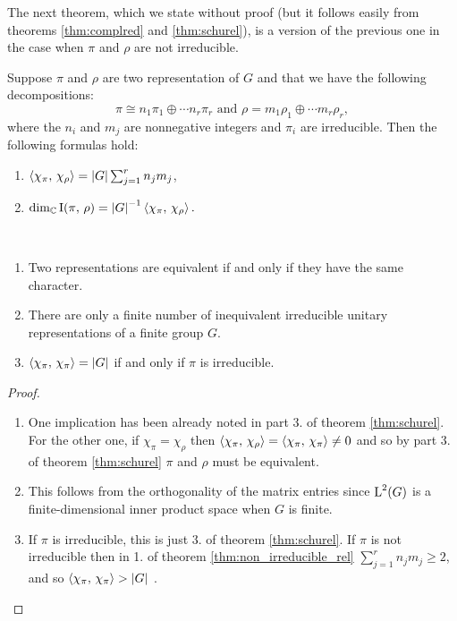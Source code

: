 The next theorem, which we state without proof (but it follows easily from theorems \ref{thm:complred} and \ref{thm:schurel}), is a version of the previous one in the case when $\pi$ and $\rho$ are not irreducible.
\begin{theorem}
\label{thm:non_irreducible_rel}
Suppose $\pi$ and $\rho$ are two representation of $G$ and that we have the following decompositions:
\[
\pi\cong n_1\pi_1\oplus\cdots n_r\pi_r\text{ and $\rho=m_1\rho_1\oplus\cdots m_r\rho_r,$}
\]
where the $n_i$ and $m_j$ are nonnegative integers and $\pi_i$ are irreducible. Then the following formulas hold:
\begin{enumerate}
\item $\braket{\chi_\pi,\, \chi_\rho}=\lvert G\rvert \sum_{j=1}^rn_jm_j$,
\item $ \dim_{\mathbb C}\operatorname{I}(\pi, \, \rho)={\lvert G\rvert}^{-1}\braket{\chi_\pi,\, \chi_\rho}.$
\end{enumerate}
\end{theorem}
\begin{cor}~ 
\begin{enumerate}
\item Two representations are equivalent if and only if they have the same character.
\item There are only a finite number of inequivalent irreducible unitary representations of a finite group $G$.
\item $\braket{\chi_\pi,\, \chi_\pi}=\lvert G\rvert$ if and only if $\pi$ is irreducible.
\end{enumerate}
\end{cor}
\begin{proof}~
\begin{enumerate}
\item One implication has been already noted in part 3. of theorem \ref{thm:schurel}. 
For the  other one, if $\chi_\pi=\chi_\rho$ then $\braket{\chi_\pi,\, \chi_\rho}=\braket{\chi_\pi,\, \chi_\pi} \neq 0$ and so by part 3. of theorem \ref{thm:schurel} $\pi$ and $\rho$ must be equivalent.
\item  This  follows  from  the orthogonality  of  the matrix  entries  since $\operatorname{L}^{2}(G)$ is a finite-dimensional inner product  space when $G$ is finite.
\item If $\pi$ is irreducible, this is just 3. of theorem \ref{thm:schurel}. If $\pi$ is not irreducible then in 1. of theorem \ref{thm:non_irreducible_rel} $\sum_{j=1}^rn_jm_j\geq 2$, and so  $\braket{\chi_\pi,\, \chi_\pi}>\lvert G\rvert$ .
\end{enumerate}

\end{proof}
